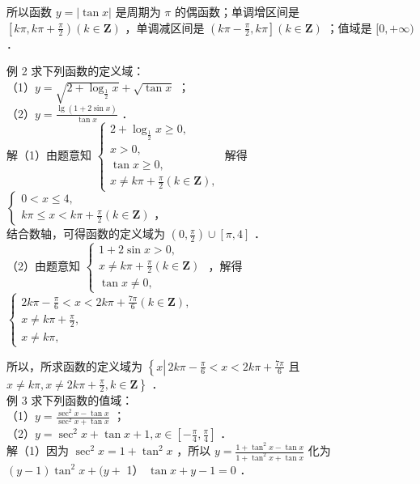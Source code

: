 \documentclass[10pt]{article}
\begin{document}
所以函数 \(y=|\tan x|\) 是周期为 \(\pi\) 的偶函数；单调增区间是 \(\left[k \pi, k \pi+\frac{\pi}{2}\right)(k \in \mathbf{Z})\) ，单调减区间是 \(\left(k \pi-\frac{\pi}{2}, k \pi\right](k \in \mathbf{Z})\) ；值域是 \([0,+\infty)\) ．

例 2 求下列函数的定义域：\\
（1）\(y=\sqrt{2+\log _{\frac{1}{2}} x}+\sqrt{\tan x}\) ；\\
（2）\(y=\frac{\lg (1+2 \sin x)}{\tan x}\) ．\\
解（1）由题意知 \(\left\{\begin{array}{l}2+\log _{\frac{1}{2}} x \geqslant 0, \\ x>0, \\ \tan x \geqslant 0, \\ x \neq k \pi+\frac{\pi}{2}(k \in \mathbf{Z}),\end{array}\right.\) 解得 \(\left\{\begin{array}{l}0<x \leqslant 4, \\ k \pi \leqslant x<k \pi+\frac{\pi}{2}(k \in \mathbf{Z}) \text { ，}\end{array}\right.\)\\
结合数轴，可得函数的定义域为 \(\left(0, \frac{\pi}{2}\right) \cup[\pi, 4]\) ．\\
（2）由题意知 \(\left\{\begin{array}{l}1+2 \sin x>0, \\ x \neq k \pi+\frac{\pi}{2}(k \in \mathbf{Z}) \\ \tan x \neq 0,\end{array}\right.\) ，解得 \(\left\{\begin{array}{l}2 k \pi-\frac{\pi}{6}<x<2 k \pi+\frac{7 \pi}{6}(k \in \mathbf{Z}), \\ x \neq k \pi+\frac{\pi}{2}, \\ x \neq k \pi,\end{array}\right.\)

所以，所求函数的定义域为 \(\left\{x \left\lvert\, 2 k \pi-\frac{\pi}{6}<x<2 k \pi+\frac{7 \pi}{6}\right.\right.\) 且 \(\left.x \neq k \pi, x \neq 2 k \pi+\frac{\pi}{2}, k \in \mathbf{Z}\right\}\) ．\\
例 3 求下列函数的值域：\\
（1）\(y=\frac{\sec ^{2} x-\tan x}{\sec ^{2} x+\tan x}\) ；\\
（2）\(y=\sec ^{2} x+\tan x+1, x \in\left[-\frac{\pi}{4}, \frac{\pi}{4}\right]\) ．\\
解（1）因为 \(\sec ^{2} x=1+\tan ^{2} x\) ，所以 \(y=\frac{1+\tan ^{2} x-\tan x}{1+\tan ^{2} x+\tan x}\) 化为 \((y-1) \tan ^{2} x+(y+\) 1） \(\tan x+y-1=0\) ．
\end{document}
